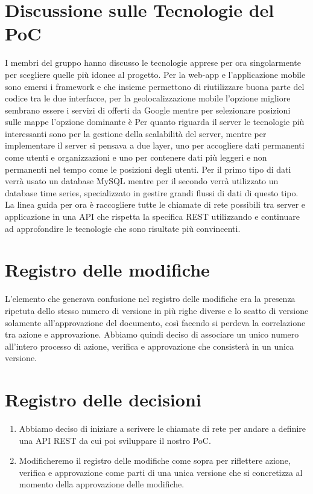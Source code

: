 \documentclass{article}
\begin{document}
\section{Discussione sulle Tecnologie del PoC}%
\label{sec:discussione_tecnologie_poc}
I membri del gruppo hanno discusso le tecnologie apprese per ora singolarmente per scegliere quelle più idonee al progetto.
Per la web-app e l'applicazione mobile sono emersi i framework  e  che insieme permettono di riutilizzare buona parte del codice tra le due interfacce, per la geolocalizzazione mobile l'opzione migliore sembrano essere i servizi di  offerti da Google mentre per selezionare posizioni sulle mappe l'opzione dominante è 
Per quanto riguarda il server le tecnologie più interessanti sono  per la gestione della scalabilità del server, mentre per implementare il server si pensava a due layer, uno per accogliere dati permanenti come utenti e organizzazioni e uno per contenere dati più leggeri e non permanenti nel tempo come le posizioni degli utenti.
Per il primo tipo di dati verrà usato un database MySQL mentre per il secondo verrà utilizzato un database time series, specializzato in gestire grandi flussi di dati di questo tipo.
La linea guida per ora è raccogliere tutte le chiamate di rete possibili tra server e applicazione in una API che rispetta la specifica REST utilizzando  e continuare ad approfondire le tecnologie che sono risultate più convincenti.

\section{Registro delle modifiche}%
\label{sec:registro_modifiche}
L'elemento che generava confusione nel registro delle modifiche era la presenza ripetuta dello stesso numero di versione in più righe diverse e lo scatto di versione solamente all'approvazione del documento, così facendo si perdeva la correlazione tra azione e approvazione.
Abbiamo quindi deciso di associare un unico numero all'intero processo di azione, verifica e approvazione che consisterà in un unica versione.

\newpage
\section{Registro delle decisioni}%
\label{sec:registro_delle_decisioni}

\begin{enumerate}
  \item Abbiamo deciso di iniziare a scrivere le chiamate di rete per andare a definire una API REST da cui poi sviluppare il nostro PoC.
  \item Modificheremo il registro delle modifiche come sopra per riflettere azione, verifica e approvazione come parti di una unica versione che si concretizza al momento della approvazione delle modifiche.
\end{enumerate}

\end{document}
